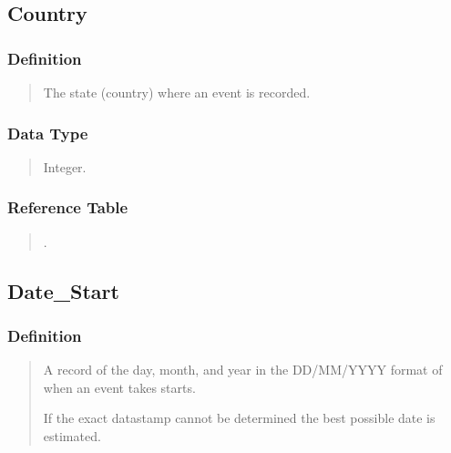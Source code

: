 \documentclass[letterpaper,10pt,english]{sphinxmanual}
\begin{document}
\subsection{Country}
\label{\detokenize{database_schema:country}}

\subsubsection{Definition}
\label{\detokenize{database_schema:id37}}\begin{quote}

\sphinxAtStartPar
The state (country) where an event is recorded.
\end{quote}


\subsubsection{Data Type}
\label{\detokenize{database_schema:id38}}\begin{quote}

\sphinxAtStartPar
Integer.
\end{quote}


\subsubsection{Reference Table}
\label{\detokenize{database_schema:id39}}\begin{quote}

\sphinxAtStartPar
{\hyperref[\detokenize{database_schema:overview-table}]{}}.
\end{quote}


\subsection{Date\_Start}
\label{\detokenize{database_schema:date-start}}

\subsubsection{Definition}
\label{\detokenize{database_schema:id40}}\begin{quote}

\sphinxAtStartPar
A record of the day, month, and year in the DD/MM/YYYY format of when an event takes starts.

\sphinxAtStartPar
If the exact datastamp cannot be determined the best possible date is estimated.
\end{quote}
\end{document}
